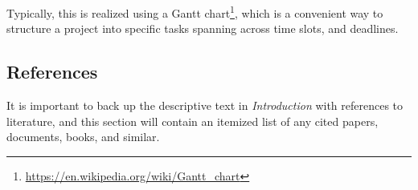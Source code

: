 \documentclass{article}
\begin{document}
Typically, this is realized using a Gantt chart\footnote{\url{https://en.wikipedia.org/wiki/Gantt_chart}}, which is a convenient way to structure a project into specific tasks spanning across time slots, and deadlines.

\subsection{References}
It is important to back up the descriptive text in \emph{Introduction} with references to literature, and this section will contain an itemized list of any cited papers, documents, books, and similar. 
\end{document}

